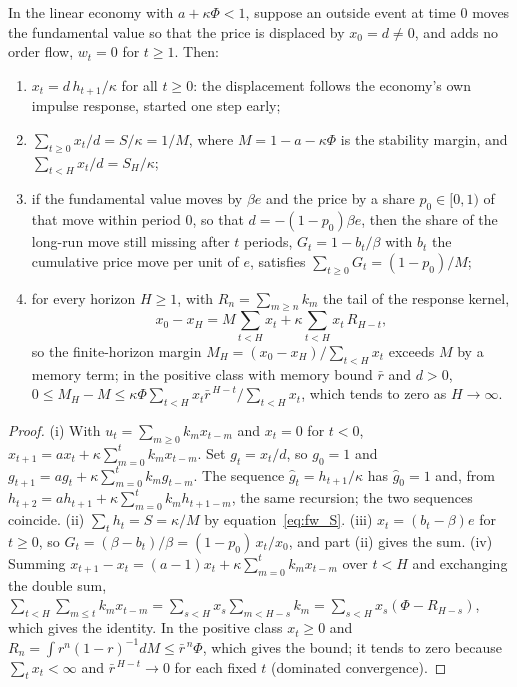 \begin{proposition}\label{prop:natural}
In the linear economy with $a+\kappa\Phi<1$, suppose an outside event at time $0$ moves the fundamental value so that the price is displaced by $x_0=d\neq0$, and adds no order flow, $w_t=0$ for $t\ge1$. Then:
\begin{enumerate}[label=(\roman*)]
\item $x_t=d\,h_{t+1}/\kappa$ for all $t\ge0$: the displacement follows the economy's own impulse response, started one step early;
\item $\sum_{t\ge0}x_t/d=S/\kappa=1/M$, where $M=1-a-\kappa\Phi$ is the stability margin, and $\sum_{t<H}x_t/d=S_H/\kappa$;
\item if the fundamental value moves by $\beta e$ and the price by a share $p_0\in[0,1)$ of that move within period $0$, so that $d=-(1-p_0)\beta e$, then the share of the long-run move still missing after $t$ periods, $G_t=1-b_t/\beta$ with $b_t$ the cumulative price move per unit of $e$, satisfies $\sum_{t\ge0}G_t=(1-p_0)/M$;
\item for every horizon $H\ge1$, with $R_n=\sum_{m\ge n}k_m$ the tail of the response kernel,
\[
x_0-x_H=M\sum_{t<H}x_t+\kappa\sum_{t<H}x_t\,R_{H-t},
\]
so the finite-horizon margin $M_H=(x_0-x_H)/\sum_{t<H}x_t$ exceeds $M$ by a memory term; in the positive class with memory bound $\bar r$ and $d>0$, $0\le M_H-M\le\kappa\Phi\sum_{t<H}x_t\bar r^{\,H-t}\big/\sum_{t<H}x_t$, which tends to zero as $H\to\infty$.
\end{enumerate}
\hfill\Proved
\end{proposition}

\begin{proof}
(i) With $u_t=\sum_{m\ge0}k_mx_{t-m}$ and $x_t=0$ for $t<0$, $x_{t+1}=ax_t+\kappa\sum_{m=0}^tk_mx_{t-m}$. Set $g_t=x_t/d$, so $g_0=1$ and $g_{t+1}=ag_t+\kappa\sum_{m=0}^tk_mg_{t-m}$. The sequence $\hat g_t=h_{t+1}/\kappa$ has $\hat g_0=1$ and, from $h_{t+2}=ah_{t+1}+\kappa\sum_{m=0}^{t}k_mh_{t+1-m}$, the same recursion; the two sequences coincide. (ii) $\sum_th_t=S=\kappa/M$ by equation~\eqref{eq:fw_S}. (iii) $x_t=(b_t-\beta)e$ for $t\ge0$, so $G_t=(\beta-b_t)/\beta=(1-p_0)\,x_t/x_0$, and part (ii) gives the sum. (iv) Summing $x_{t+1}-x_t=(a-1)x_t+\kappa\sum_{m=0}^tk_mx_{t-m}$ over $t<H$ and exchanging the double sum, $\sum_{t<H}\sum_{m\le t}k_mx_{t-m}=\sum_{s<H}x_s\sum_{m<H-s}k_m=\sum_{s<H}x_s(\Phi-R_{H-s})$, which gives the identity. In the positive class $x_t\ge0$ and $R_n=\int r^n(1-r)^{-1}dM\le\bar r^{\,n}\Phi$, which gives the bound; it tends to zero because $\sum_tx_t<\infty$ and $\bar r^{\,H-t}\to0$ for each fixed $t$ (dominated convergence).
\end{proof}

